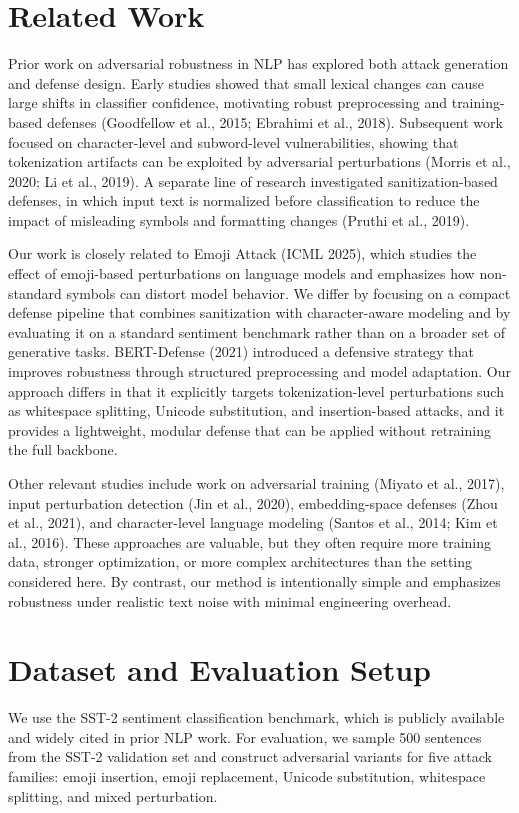 \documentclass[11pt]{article}
\begin{document}
\section{Related Work}
Prior work on adversarial robustness in NLP has explored both attack generation and defense design. Early studies showed that small lexical changes can cause large shifts in classifier confidence, motivating robust preprocessing and training-based defenses (Goodfellow et al., 2015; Ebrahimi et al., 2018). Subsequent work focused on character-level and subword-level vulnerabilities, showing that tokenization artifacts can be exploited by adversarial perturbations (Morris et al., 2020; Li et al., 2019). A separate line of research investigated sanitization-based defenses, in which input text is normalized before classification to reduce the impact of misleading symbols and formatting changes (Pruthi et al., 2019).

Our work is closely related to Emoji Attack (ICML 2025), which studies the effect of emoji-based perturbations on language models and emphasizes how non-standard symbols can distort model behavior. We differ by focusing on a compact defense pipeline that combines sanitization with character-aware modeling and by evaluating it on a standard sentiment benchmark rather than on a broader set of generative tasks. BERT-Defense (2021) introduced a defensive strategy that improves robustness through structured preprocessing and model adaptation. Our approach differs in that it explicitly targets tokenization-level perturbations such as whitespace splitting, Unicode substitution, and insertion-based attacks, and it provides a lightweight, modular defense that can be applied without retraining the full backbone.

Other relevant studies include work on adversarial training (Miyato et al., 2017), input perturbation detection (Jin et al., 2020), embedding-space defenses (Zhou et al., 2021), and character-level language modeling (Santos et al., 2014; Kim et al., 2016). These approaches are valuable, but they often require more training data, stronger optimization, or more complex architectures than the setting considered here. By contrast, our method is intentionally simple and emphasizes robustness under realistic text noise with minimal engineering overhead.

\section{Dataset and Evaluation Setup}
We use the SST-2 sentiment classification benchmark, which is publicly available and widely cited in prior NLP work. For evaluation, we sample 500 sentences from the SST-2 validation set and construct adversarial variants for five attack families: emoji insertion, emoji replacement, Unicode substitution, whitespace splitting, and mixed perturbation.
\end{document}
